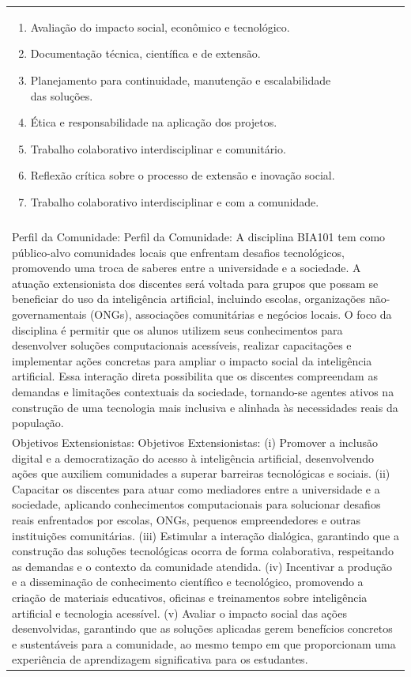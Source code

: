 \documentclass[11pt]{article}
\begin{document}
\begin{center}
\begin{longtable}{|p{4cm}|p{4cm}|p{4cm}|p{4cm}|}
{\begin{enumerate}
\item Avaliação do impacto social, econômico e tecnológico.
\item Documentação técnica, científica e de extensão.
\item Planejamento para continuidade, manutenção e escalabilidade das soluções.
\item Ética e responsabilidade na aplicação dos projetos.
\item Trabalho colaborativo interdisciplinar e comunitário.
\item Reflexão crítica sobre o processo de extensão e inovação social.
\item Trabalho colaborativo interdisciplinar e com a comunidade.\end{enumerate}}\\
\multicolumn{4}{|p{16cm}|}{}\\
\multicolumn{4}{|p{16cm}|}{Perfil da Comunidade: Perfil da Comunidade: A disciplina BIA101 tem como público-alvo comunidades locais que enfrentam desafios tecnológicos, promovendo uma troca de saberes entre a universidade e a sociedade. A atuação extensionista dos discentes será voltada para grupos que possam se beneficiar do uso da inteligência artificial, incluindo escolas, organizações não-governamentais (ONGs), associações comunitárias e negócios locais. O foco da disciplina é permitir que os alunos utilizem seus conhecimentos para desenvolver soluções computacionais acessíveis, realizar capacitações e implementar ações concretas para ampliar o impacto social da inteligência artificial. Essa interação direta possibilita que os discentes compreendam as demandas e limitações contextuais da sociedade, tornando-se agentes ativos na construção de uma tecnologia mais inclusiva e alinhada às necessidades reais da população.}\\
\multicolumn{4}{|p{16cm}|}{Objetivos Extensionistas: Objetivos Extensionistas: (i) Promover a inclusão digital e a democratização do acesso à inteligência artificial, desenvolvendo ações que auxiliem comunidades a superar barreiras tecnológicas e sociais. (ii) Capacitar os discentes para atuar como mediadores entre a universidade e a sociedade, aplicando conhecimentos computacionais para solucionar desafios reais enfrentados por escolas, ONGs, pequenos empreendedores e outras instituições comunitárias. (iii) Estimular a interação dialógica, garantindo que a construção das soluções tecnológicas ocorra de forma colaborativa, respeitando as demandas e o contexto da comunidade atendida. (iv) Incentivar a produção e a disseminação de conhecimento científico e tecnológico, promovendo a criação de materiais educativos, oficinas e treinamentos sobre inteligência artificial e tecnologia acessível. (v) Avaliar o impacto social das ações desenvolvidas, garantindo que as soluções aplicadas gerem benefícios concretos e sustentáveis para a comunidade, ao mesmo tempo em que proporcionam uma experiência de aprendizagem significativa para os estudantes.}\\

\end{longtable}
\end{center}
\end{document}
